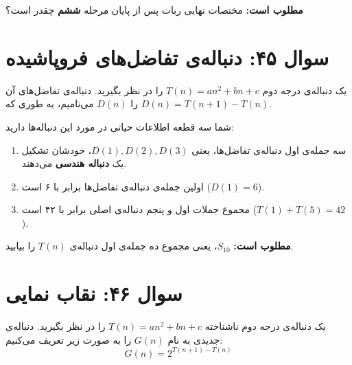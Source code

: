 \documentclass[12pt]{article}
\begin{document}
	\textbf{مطلوب است:} مختصات نهایی ربات پس از پایان مرحله \textbf{ششم} چقدر است؟
	
	\vspace{1cm}
	\hrulefill
	\vspace{1cm}
	
	\section*{سوال ۴۵: دنباله‌ی تفاضل‌های فروپاشیده}
	یک دنباله‌ی درجه دوم \( T(n) = an^2 + bn + c \) را در نظر بگیرید. دنباله‌ی تفاضل‌های آن را \(D(n)\) می‌نامیم، به طوری که \( D(n) = T(n+1) - T(n) \).
	\vspace{0.5cm}
	
	شما سه قطعه اطلاعات حیاتی در مورد این دنباله‌ها دارید:
	\begin{enumerate}[label=(\roman*)]
		\item سه جمله‌ی اول دنباله‌ی تفاضل‌ها، یعنی \(D(1), D(2), D(3)\)، خودشان تشکیل یک \textbf{دنباله هندسی} می‌دهند.
		\item اولین جمله‌ی دنباله‌ی تفاضل‌ها برابر با ۶ است (\(D(1) = 6\)).
		\item مجموع جملات اول و پنجم دنباله‌ی اصلی برابر با ۴۲ است (\(T(1) + T(5) = 42\)).
	\end{enumerate}
	\vspace{0.5cm}
	
	\textbf{مطلوب است:} \(S_{10}\)، یعنی مجموع ده جمله‌ی اول دنباله‌ی \(T(n)\) را بیابید.
	
	\vspace{1cm}
	\hrulefill
	\vspace{1cm}
	
	\section*{سوال ۴۶: نقاب نمایی }
	یک دنباله‌ی درجه دوم ناشناخته \( T(n) = an^2 + bn + c \) را در نظر بگیرید. دنباله‌ی جدیدی به نام \(G(n)\) را به صورت زیر تعریف می‌کنیم:
	\begin{displaymath}
		G(n) = 2^{T(n+1) - T(n)}
	\end{displaymath}
	\vspace{0.5cm}
	
\end{document}
